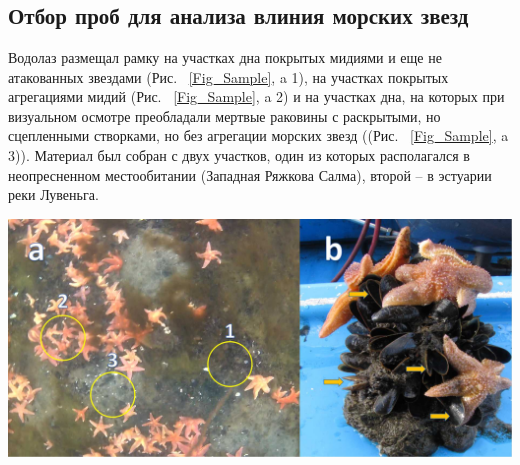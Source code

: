 \documentclass[a0,portrait]{a0poster}
\begin{document}
\begin{minipage}[t]{0.5\linewidth}

\section*{}

\subsection*{Отбор проб для анализа влиния морских звезд}

%
\begin{minipage}[t]{0.4\linewidth}
Водолаз размещал рамку на участках дна покрытых мидиями и еще не атакованных звездами (Рис. ~\ref{Fig_Sample}, a 1), на участках покрытых агрегациями мидий  (Рис. ~\ref{Fig_Sample}, a 2) и на участках дна, на которых при визуальном осмотре преобладали мертвые раковины с раскрытыми, но сцепленными створками, но без агрегации морских звезд ((Рис. ~\ref{Fig_Sample}, a 3)). Материал был собран с двух участков, один из которых располагался в неопресненном местообитании (Западная Ряжкова Салма), второй -- в эстуарии реки Лувеньга.
\end{minipage}\hspace{1cm}
%
\begin{minipage}[t]{0.5\linewidth}		
	\begin{center}\vspace{0.1cm}
			\includegraphics[width=0.8\linewidth]{Samples.jpg}
			\label{Fig_Sample}
		\end{center}
\end{minipage}\hspace{0.5cm}




\end{minipage}
\end{document}
